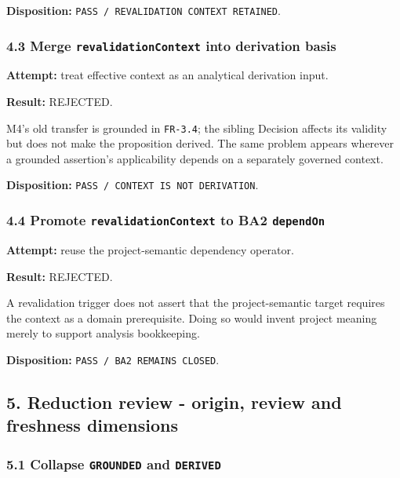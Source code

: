 \documentclass[11pt,a4paper]{article}
\begin{document}
\textbf{Disposition:} \texttt{PASS\ /\ REVALIDATION\ CONTEXT\ RETAINED}.

\subsubsection{\texorpdfstring{4.3 Merge \texttt{revalidationContext} into derivation basis}{4.3 Merge revalidationContext into derivation basis}}\label{merge-revalidationcontext-into-derivation-basis}

\textbf{Attempt:} treat effective context as an analytical derivation input.

\textbf{Result:} REJECTED.

M4's old transfer is grounded in \texttt{FR-3.4}; the sibling Decision affects its validity but does not make the proposition derived. The same problem appears wherever a grounded assertion's applicability depends on a separately governed context.

\textbf{Disposition:} \texttt{PASS\ /\ CONTEXT\ IS\ NOT\ DERIVATION}.

\subsubsection{\texorpdfstring{4.4 Promote \texttt{revalidationContext} to BA2 \texttt{dependOn}}{4.4 Promote revalidationContext to BA2 dependOn}}\label{promote-revalidationcontext-to-ba2-dependon}

\textbf{Attempt:} reuse the project-semantic dependency operator.

\textbf{Result:} REJECTED.

A revalidation trigger does not assert that the project-semantic target requires the context as a domain prerequisite. Doing so would invent project meaning merely to support analysis bookkeeping.

\textbf{Disposition:} \texttt{PASS\ /\ BA2\ REMAINS\ CLOSED}.

\subsection{5. Reduction review - origin, review and freshness dimensions}\label{reduction-review---origin-review-and-freshness-dimensions}

\subsubsection{\texorpdfstring{5.1 Collapse \texttt{GROUNDED} and \texttt{DERIVED}}{5.1 Collapse GROUNDED and DERIVED}}\label{collapse-grounded-and-derived}
\end{document}
